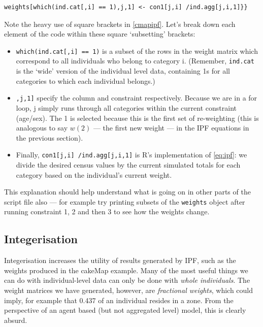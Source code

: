 \documentclass[a4paper, 11pt, twoside]{article}
\begin{document}
\begin{lstlisting}[float=h, caption={Saving the new weights after the first
constraint of IPF --- see line 43 in `cMap.R'}, label=cmapipf]
weights[which(ind.cat[,i] == 1),j,1] <- con1[j,i] /ind.agg[j,i,1]}}
\end{lstlisting}

Note the heavy use of square brackets in \cref{cmapipf}.
Let's break down each element of the code within these square `subsetting' brackets:
\begin{itemize}
 \item \texttt{which(ind.cat[,i] == 1)} is a subset of the rows in the weight matrix
 which correspond to all individuals who belong to category i. (Remember,
 \texttt{ind.cat} is the `wide' version of the individual level data, containing
 1s for all categories to which each individual belongs.)
 \item \texttt{,j,1]} specify the column and constraint respectively.
 Because we are in a for loop, j simply runs through all categories within the
 current constraint (age/sex). The 1 is selected because this is the first set of
 re-weighting (this is analogous to say $w(2)$ --- the first new weight ---
 in the IPF equations in the previous section).
 \item Finally, \texttt{con1[j,i] /ind.agg[j,i,1]} is R's implementation of
 \cref{eq:ipf}: we divide the desired census values by the current simulated
 totals for each category based on the individual's current weight.
\end{itemize}

This explanation should help understand what is going on in other
parts of the script file also --- for example try printing subsets of
the \texttt{weights} object after running constraint 1, 2 and then 3 to
see how the weights change.


\subsection{Integerisation}
Integerisation increases the utility of results generated
by IPF, such as the weights produced in the cakeMap example.
Many of the most useful things we can do with individual-level data can only
be done with \emph{whole individuals}. The weight matrices we have generated, however,
are \emph{fractional weights}, which could imply, for example that 0.437 of an
individual resides in a zone. From the perspective of an agent based (but not
aggregated level) model, this is clearly absurd.
\end{document}
